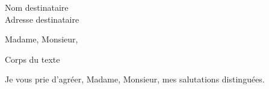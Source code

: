 \documentclass[12pt]{lettre}
\begin{document}
\begin{letter}{Nom destinataire\\Adresse destinataire}
\def\concname{\bf Objet :~} %
\address{Louis Plissonneau\\
139, Glenageary Avenue\\
Glenageary\\
County Dublin\\
Ireland}
\nofax
\signature{Louis Plissonneau}
\opening{Madame, Monsieur,}
  Corps du texte
\closing{Je vous prie d'agréer,
Madame, Monsieur,
mes salutations distinguées.}

\end{letter}
\end{document}
